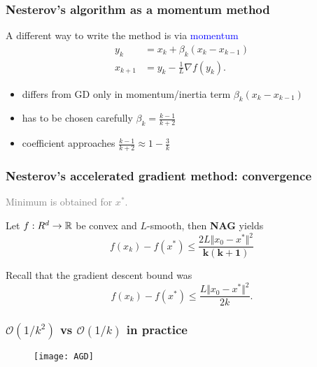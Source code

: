 \documentclass[aspectratio=149]{beamer}
\begin{document}
\begin{frame}
  \frametitle{Nesterov's algorithm as a momentum method}
  A different way to write the method is via \textcolor{blue}{momentum}
  \begin{align}
    y_{k} &= x_k + \beta_k (x_k - x_{k-1}) \\
    x_{k+1} &= y_k - \frac{1}{L} \nabla f(y_k).
  \end{align}

  \begin{itemize}
    \item differs from GD only in momentum/inertia term $\beta_k (x_k - x_{k-1})$
    \item has to be chosen carefully $\beta_k = \frac{k-1}{k+2}$
    \item coefficient approaches $\frac{k-1}{k+2} \approx 1 - \frac{3}{k}$
  \end{itemize}
\end{frame}


\begin{frame}
  \frametitle{Nesterov's accelerated gradient method: convergence}
  \textcolor{gray}{Minimum is obtained for $x^*$.}
  \begin{theorem}
    Let $f: R^d \to \mathbb{R}$ be convex and $L$-smooth, then \textbf{NAG} yields
    \begin{equation}
      f(x_k) - f(x^*) \le \frac{2L \Vert x_0-x^* \Vert^2}{\bm{k(k+1)}}
    \end{equation}
  \end{theorem}

  Recall that the gradient descent bound was
  \begin{equation}
      f(x_k) - f(x^*) \le \frac{L \Vert x_0-x^* \Vert^2}{2k}.
  \end{equation}
\end{frame}


\begin{frame}
  \frametitle{$\mathcal{O}(1/k^2)$ vs $\mathcal{O}(1/k)$ in practice}

  \begin{figure}[ht]
    \centering
    \texttt{[image: AGD]}
  \end{figure}


\end{frame}
\end{document}

